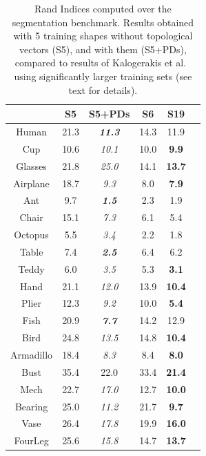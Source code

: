 \begin{table}[t!]
\begin{center}
\begin{tabular}{|c|c|c|c|c|c|}
  \hline
   & S5 & S5+PDs & S6 & S19\\
  \hline
  Human & 21.3 & \textit{\textbf{11.3}} & 14.3 & 11.9 \\ 
\hline
  Cup & 10.6 & \textit{10.1} & 10.0 & \textbf{9.9} \\
\hline
  Glasses & 21.8 & \textit{25.0} & 14.1 & \textbf{13.7} \\
\hline
  Airplane & 18.7 & \textit{9.3} & 8.0 & \textbf{7.9} \\
\hline
  Ant & 9.7 & \textit{\textbf{1.5}} & 2.3 & 1.9 \\
\hline
  Chair & 15.1 & \textit{7.3} & 6.1 & 5.4 \\
\hline
  Octopus & 5.5 & \textit{3.4} & 2.2 & 1.8 \\
\hline
  Table & 7.4 & \textit{\textbf{2.5}} & 6.4 & 6.2 \\
\hline
  Teddy & 6.0 & \textit{3.5} & 5.3 & \textbf{3.1} \\
\hline
  Hand & 21.1 & \textit{12.0} & 13.9 & \textbf{10.4} \\
\hline
  Plier & 12.3 & \textit{9.2} & 10.0 & \textbf{5.4}\\
\hline
  Fish & 20.9 & \textit{\textbf{7.7}} & 14.2 & 12.9 \\
\hline
  Bird & 24.8 & \textit{13.5} & 14.8 &  \textbf{10.4} \\
\hline
  Armadillo & 18.4 & \textit{ 8.3} & 8.4 &  \textbf{8.0} \\
\hline
  Bust & 35.4 & 22.0 & 33.4 & \textbf{21.4} \\
\hline
  Mech & 22.7 & \textit{ 17.0} & 12.7 & \textbf{10.0} \\
\hline
  Bearing & 25.0 & \textit{ 11.2} & 21.7 & \textbf{9.7} \\
\hline
  Vase & 26.4 & \textit{ 17.8} & 19.9 & \textbf{16.0} \\
\hline
  FourLeg & 25.6 & \textit{ 15.8} & 14.7 & \textbf{13.7} \\
  \hline
\end{tabular}
\end{center}
\caption{\label{tab:RI} Rand Indices computed over the segmentation benchmark. 
Results obtained with 5 training shapes without topological vectors (S5), and with them
(S5+PDs), compared to results of Kalogerakis et al.~\cite{Kalogerakis10} using significantly
larger training sets (see text for details).}

\end{table}





